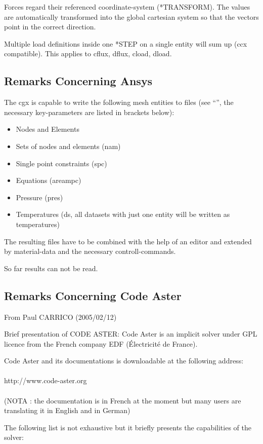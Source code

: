 \documentclass{article}
\begin{document}
\begin{appendix}
Forces regard their referenced coordinate-system (*TRANSFORM). The values are automatically transformed into the global cartesian system so that the vectors point in the correct direction.

Multiple load definitions inside one *STEP on a single entity will sum up (ccx compatible). This applies to cflux, dflux, cload, dload.

\subsection{\label{Remarks Concerning Ansys}Remarks Concerning Ansys}
The cgx is capable to write the following mesh entities to files (see ``'', the necessary key-parameters are listed in brackets below):
\begin{itemize}
\item Nodes and Elements 
\item Sets of nodes and elements (nam)
\item Single point constraints (spc)
\item Equations (areampc)
\item Pressure (pres)
\item Temperatures (ds, all datasets with just one entity will be written as temperatures)
\end{itemize}
The resulting files have to be combined with the help of an editor and extended by material-data and the necessary controll-commands. 

So far results can not be read.

\subsection{\label{Remarks Concerning Code Aster}Remarks Concerning Code Aster}
From Paul CARRICO (2005/02/12)

Brief presentation of CODE ASTER: Code Aster is an implicit  solver under GPL licence from the French company EDF (\'{E}lectricit\'{e} de France).

Code Aster and its documentations is downloadable at the following address:\\\\http://www.code-aster.org\\\\(NOTA : the documentation is in French at the moment but many users are translating it in English and in German)

The following list is not exhaustive but it briefly presents the capabilities of the solver:


\end{appendix}
\end{document}

